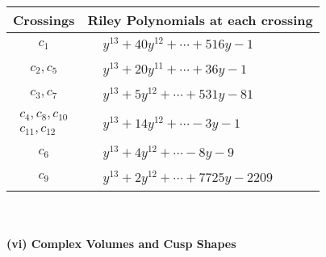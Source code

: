 \documentclass[1p]{elsarticle_modified}
\theoremstyle{definition}
\begin{document}
\begin{tabular}{m{50pt}|m{274pt}}
Crossings & \hspace{64pt}Riley Polynomials at each crossing \\
\hline $$\begin{aligned}c_{1}\end{aligned}$$&$\begin{aligned}
&y^{13}+40 y^{12}+\cdots+516 y-1
\end{aligned}$\\
\hline $$\begin{aligned}c_{2},c_{5}\end{aligned}$$&$\begin{aligned}
&y^{13}+20 y^{11}+\cdots+36 y-1
\end{aligned}$\\
\hline $$\begin{aligned}c_{3},c_{7}\end{aligned}$$&$\begin{aligned}
&y^{13}+5 y^{12}+\cdots+531 y-81
\end{aligned}$\\
\hline $$\begin{aligned}c_{4},c_{8},c_{10}\\c_{11},c_{12}\end{aligned}$$&$\begin{aligned}
&y^{13}+14 y^{12}+\cdots-3 y-1
\end{aligned}$\\
\hline $$\begin{aligned}c_{6}\end{aligned}$$&$\begin{aligned}
&y^{13}+4 y^{12}+\cdots-8 y-9
\end{aligned}$\\
\hline $$\begin{aligned}c_{9}\end{aligned}$$&$\begin{aligned}
&y^{13}+2 y^{12}+\cdots+7725 y-2209
\end{aligned}$\\
\hline
\end{tabular}\\~\\
\newpage\flushleft \textbf{(vi) Complex Volumes and Cusp Shapes}
\end{document}

